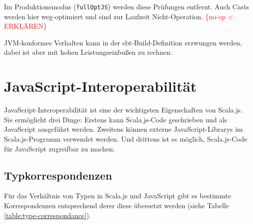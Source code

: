 \documentclass[a4paper, 12pt, hidelinks, listof=totoc, listoftables=totoc, bibliography=totoc]{scrreprt}
\newcommand{\code}[1]{\lstinline[language=Scala, style=inline]|#1|}
\newcommand{\TODOi}[1]{\textcolor{red}{\{#1\}}}
\begin{document}
Im Produktionsmodus (\code{fullOptJS}) werden diese Prüfungen entfernt. Auch Casts werden hier weg-optimiert und sind zur Laufzeit Nicht-Operation. \TODOi{no-op <-- ERKLÄREN}

JVM-konformes Verhalten kann in der sbt-Build-Definition erzwungen werden, dabei ist aber mit hohen Leistungseinbußen zu rechnen.\cite[Folie 23 ff., Min. 15]{doeraene2015.SSP}\cite{scalajs.DSS}

	


\section{JavaScript-Interoperabilität}

JavaScript-Interoperabilität ist eine der wichtigsten Eigenschaften von Scala.js. Sie ermöglicht drei Dinge: Erstens kann Scala.js-Code geschrieben und als JavaScript ausgeführt werden. Zweitens können externe JavaScript-Librarys im Scala.js-Programm verwendet werden. Und drittens ist es möglich, Scala.js-Code für JavaScript zugreifbar zu machen.

\subsection{Typkorrespondenzen}

Für das Verhältnis von Typen in Scala.js und JavaScript gibt es bestimmte Korrespondenzen entsprechend derer diese übersetzt werden (siehe Tabelle \ref{table:type-correspondance}).
\end{document}
